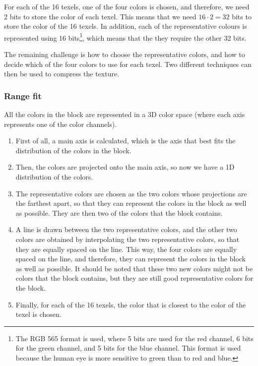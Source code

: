 For each of the 16 texels, one of the four colors is chosen, and therefore, we need 2 bits to store the color of each texel. This means that we need $16\cdot 2 = 32$ bits to store the color of the 16 texels. In addition, each of the representative colours is represented using 16 bits\footnote{The RGB 565 format is used, where 5 bits are used for the red channel, 6 bits for the green channel, and 5 bits for the blue channel. This format is used because the human eye is more sensitive to green than to red and blue.}, which means that the they require the other 32 bits.

The remaining challenge is how to choose the representative colors, and how to decide which of the four colors to use for each texel. Two different techniques can then be used to compress the texture.

\subsubsection{Range fit}

All the colors in the block are represented in a 3D color space (where each axis represents one of the color channels).
\begin{enumerate}
    \item First of all, a main axis is calculated, which is the axis that best fits the distribution of the colors in the block.
    \item Then, the colors are projected onto the main axis, so now we have a 1D distribution of the colors.
    \item The representative colors are chosen as the two colors whose projections are the farthest apart, so that they can represent the colors in the block as well as possible. They are then two of the colors that the block contains.
    \item A line is drawn between the two representative colors, and the other two colors are obtained by interpolating the two representative colors, so that they are equally spaced on the line. This way, the four colors are equally spaced on the line, and therefore, they can represent the colors in the block as well as possible. It should be noted that these two new colors might not be colors that the block contains, but they are still good representative colors for the block.
    \item Finally, for each of the 16 texels, the color that is closest to the color of the texel is chosen.
\end{enumerate}

